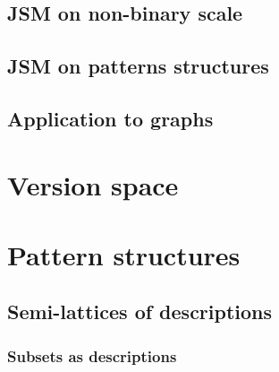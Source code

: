 \documentclass[a4paper]{article}
\begin{document}

\subsection{JSM on non-binary scale} %
\label{sub:dsm_on_non_binary_scale}


\subsection{JSM on patterns structures} %
\label{sub:dsm_on_patterns_structures}


\subsection{Application to graphs} %
\label{sub:application_to_graphs}



\section{Version space} %
\label{sec:version_space}


\section{Pattern structures} %
\label{sec:pattern_structures}

\subsection{Semi-lattices of descriptions} %
\label{sub:semi_lattices_of_descriptions}

\subsubsection*{Subsets as descriptions} %
\label{ssub:subsets_as_descriptions}
\end{document}
